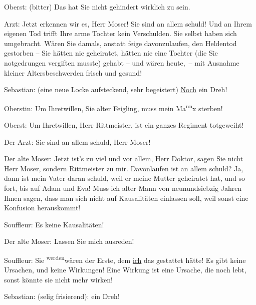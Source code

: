 \pstart
           Oberst: (bitter) Das hat Sie nicht gehindert wirklich zu sein.\pend
           
\pstart
           Arzt: Jetzt erkennen wir es, Herr Moser! Sie sind an allem schuld! Und an Ihrem
               eigenen Tod trifft Ihre arme Tochter kein Verschulden. Sie selbst haben sich
               umgebracht. Wären Sie damals, anstatt feige davonzulaufen, den Heldentod gestorben –
               Sie hätten nie geheiratet, hätten nie eine Tochter (die Sie notgedrungen vergiften
               musste) gehabt – und wären heute, – mit Ausnahme kleiner Altersbeschwerden frisch und
               gesund!\pend
           
\pstart
           Sebastian: (eine neue Locke aufsteckend, sehr begeistert) \uline{Noch} ein Dreh!\pend
           
\pstart
           Oberstin: Um Ihretwillen, Sie alter Feigling, muss mein Ma\substVorne{}\textsuperscript{nn}\substDazwischen{}x\substHinten{} sterben!\pend
           
\pstart
           Oberst: Um Ihretwillen, Herr Rittmeister, ist ein ganzes Regiment totgeweiht!\pend
           
\pstart
           Der Arzt: Sie sind an allem schuld, Herr Moser!\pend
           
\pstart
           Der alte Moser: Jetzt ist’s zu viel und vor allem, Herr Doktor, sagen Sie nicht Herr
               Moser, sondern Rittmeister zu mir.  Davonlaufen ist an
               allem schuld? Ja, {\pb}dann ist mein
               Vater daran schuld, weil er meine Mutter geheiratet hat, und so fort, bis auf Adam
               und Eva! Muss ich alter Mann von neunundsiebzig Jahren Ihnen sagen, dass man sich
               nicht auf Kausalitäten einlassen soll, weil sonst eine Konfusion herauskommt!\pend
           
\pstart
           Souffleur: Es  keine Kausalitäten!\pend
           
\pstart
           Der alte Moser: Lassen Sie mich ausreden!\pend
           
\pstart
           Souffleur: Sie \substVorne{}\textsuperscript{werden}\substDazwischen{}wären\substHinten{} der Erste, dem \uline{ich} das gestattet hätte! Es
               gibt keine Ursachen, und keine Wirkungen! Eine Wirkung ist eine Ursache, die noch
               lebt, sonst könnte sie nicht mehr wirken!\pend
           
\pstart
           Sebastian: (selig frisierend):  ein Dreh!\pend
           
